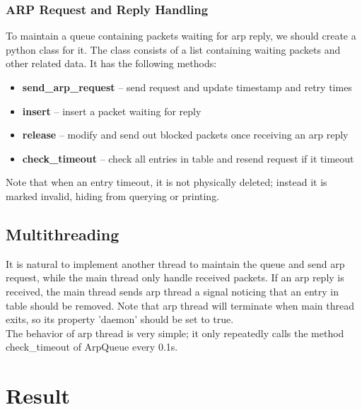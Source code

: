 \documentclass[12pt,a4paper,UTF8]{article}
\begin{document}
\subsubsection{ARP Request and Reply Handling}
To maintain a queue containing packets waiting for arp reply, we should create a python class for it. The class consists of a list containing waiting packets and other related data. It has the following methods:
\begin{itemize}
	\item \textbf{send\_arp\_request} -- send request and update timestamp and retry times
	
	\item \textbf{insert} -- insert a packet waiting for reply
	
	\item \textbf{release} -- modify and send out blocked packets once receiving an arp reply
	
	\item \textbf{check\_timeout} -- check all entries in table and resend request if it timeout
	
\end{itemize}
Note that when an entry timeout, it is not physically deleted; instead it is marked invalid, hiding from querying or printing. \\

\subsection{Multithreading}
It is natural to implement another thread to maintain the queue and send arp request, while the main thread only handle received packets. If an arp reply is received, the main thread sends arp thread a signal noticing that an entry in table should be removed. Note that arp thread will terminate when main thread exits, so its property 'daemon' should be set to true. \\
The behavior of arp thread is very simple; it only repeatedly calls the method check\_timeout of ArpQueue every 0.1s.


\section{Result}
\end{document}
